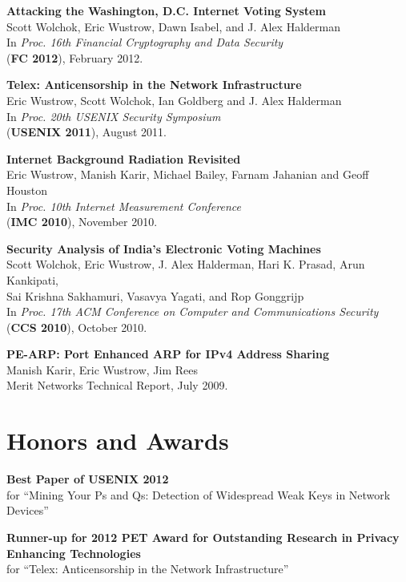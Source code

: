 \documentclass{res}
\begin{document}
\begin{resume}
    \textbf{Attacking the Washington, D.C. Internet Voting System} \\
    Scott Wolchok, Eric Wustrow, Dawn Isabel, and J. Alex Halderman \\
    In \emph{Proc. 16th Financial Cryptography and Data Security} \\
    (\textbf{FC 2012}), February 2012.

    \textbf{Telex: Anticensorship in the Network Infrastructure} \\
    Eric Wustrow, Scott Wolchok, Ian Goldberg and J. Alex Halderman \\
    In \emph{Proc. 20th USENIX Security Symposium} \\
    (\textbf{USENIX 2011}), August 2011.

	\textbf{Internet Background Radiation Revisited} \\
	Eric Wustrow, Manish Karir, Michael Bailey, Farnam Jahanian and Geoff Houston \\
	In \emph{Proc. 10th Internet Measurement Conference} \\
	(\textbf{IMC 2010}), November 2010.

	\textbf{Security Analysis of India's Electronic Voting  Machines} \\ 
	Scott Wolchok, Eric Wustrow, J. Alex Halderman, Hari K. Prasad, Arun Kankipati, \\
	Sai Krishna Sakhamuri, Vasavya Yagati, and Rop Gonggrijp \\
	In \emph{Proc. 17th ACM Conference on Computer and Communications 
	Security} \\
	(\textbf{CCS 2010}), October 2010.

	\textbf{PE-ARP: Port Enhanced ARP for IPv4 Address Sharing} \\
	Manish Karir, Eric Wustrow, Jim Rees \\
	Merit Networks Technical Report, July 2009.	

\section{Honors and Awards}

    \textbf{Best Paper of USENIX 2012} \\
    for ``Mining Your Ps and Qs: Detection of Widespread Weak Keys in Network Devices''

    \textbf{Runner-up for 2012 PET Award for Outstanding Research in Privacy Enhancing Technologies} \\
    for ``Telex: Anticensorship in the Network Infrastructure''


\end{resume}
\end{document}
